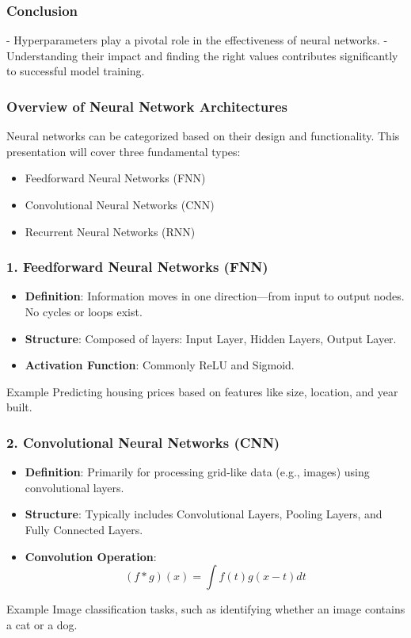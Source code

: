 \documentclass[aspectratio=169]{beamer}
\begin{document}
\begin{frame}[fragile]
    \frametitle{Conclusion}
    - Hyperparameters play a pivotal role in the effectiveness of neural networks.
    - Understanding their impact and finding the right values contributes significantly to successful model training.
\end{frame}

\begin{frame}[fragile]
    \frametitle{Overview of Neural Network Architectures}
    \begin{block}{}
        Neural networks can be categorized based on their design and functionality. This presentation will cover three fundamental types:
    \end{block}
    \begin{itemize}
        \item Feedforward Neural Networks (FNN)
        \item Convolutional Neural Networks (CNN)
        \item Recurrent Neural Networks (RNN)
    \end{itemize}
\end{frame}

\begin{frame}[fragile]
    \frametitle{1. Feedforward Neural Networks (FNN)}
    \begin{itemize}
        \item \textbf{Definition}: Information moves in one direction—from input to output nodes. No cycles or loops exist.
        \item \textbf{Structure}: Composed of layers: Input Layer, Hidden Layers, Output Layer.
        \item \textbf{Activation Function}: Commonly ReLU and Sigmoid.
    \end{itemize}
    \begin{block}{Example}
        Predicting housing prices based on features like size, location, and year built. 
    \end{block}
\end{frame}

\begin{frame}[fragile]
    \frametitle{2. Convolutional Neural Networks (CNN)}
    \begin{itemize}
        \item \textbf{Definition}: Primarily for processing grid-like data (e.g., images) using convolutional layers.
        \item \textbf{Structure}: Typically includes Convolutional Layers, Pooling Layers, and Fully Connected Layers.
        \item \textbf{Convolution Operation}:
        \begin{equation}
            (f * g)(x) = \int f(t)g(x - t) dt
        \end{equation}
    \end{itemize}
    \begin{block}{Example}
        Image classification tasks, such as identifying whether an image contains a cat or a dog. 
    \end{block}
\end{frame}
\end{document}
